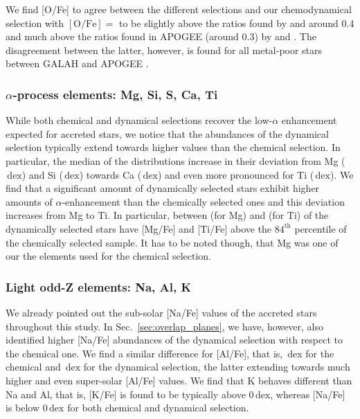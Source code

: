 \documentclass[fleqn,usenatbib]{mnras}
\newcommand{\dex}{\,\mathrm{dex}}	%
\begin{document}
We find [O/Fe] to agree between the different selections and our chemodynamical selection with $\mathrm{[O/Fe]} =$  to be slightly above the ratios found by \citet{Ramirez2012b} and \citet{Nissen2014} around 0.4 and much above the ratios found in APOGEE (around 0.3) by \citet{Hawkins2015} and \citet{Hayes2018}. The disagreement between the latter, however, is found for all metal-poor stars between GALAH and APOGEE \citep[e.g.][]{Buder2018}.

\subsubsection{$\alpha$-process elements: Mg, Si, S, Ca, Ti} \label{sec:chronochemodynamics_alpha}

While both chemical and dynamical selections recover the low-$\alpha$ enhancement expected for accreted stars, we notice that the abundances of the dynamical selection typically extend towards higher values than the chemical selection. In particular, the median of the distributions increase in their deviation from Mg ($\dex$) and Si ($\dex$) towards Ca ($\dex$) and even more pronounced for Ti ($\dex$). We find that a significant amount of dynamically selected stars exhibit higher amounts of $\alpha$-enhancement than the chemically selected ones and this deviation increases from Mg to Ti. In particular, between  (for Mg) and  (for Ti) of the dynamically selected stars have [Mg/Fe] and [Ti/Fe] above the $84^\text{th}$ percentile of the chemically selected sample. It has to be noted though, that Mg was one of our the elements used for the chemical selection.

\subsubsection{Light odd-Z elements: Na, Al, K} \label{sec:chronochemodynamics_oddz}

We already pointed out the sub-solar [Na/Fe] values of the accreted stars throughout this study. In Sec.~\ref{sec:overlap_planes}, we have, however, also identified higher [Na/Fe] abundances of the dynamical selection with respect to the chemical one. We find a similar difference for [Al/Fe], that is, $\dex$ for the chemical and $\dex$ for the dynamical selection, the latter extending towards much higher and even super-solar [Al/Fe] values. We find that K behaves different than Na and Al, that is, [K/Fe] is found to be typically above $0\dex$, whereas [Na/Fe] is below $0\dex$ for both chemical and dynamical selection.
\end{document}

